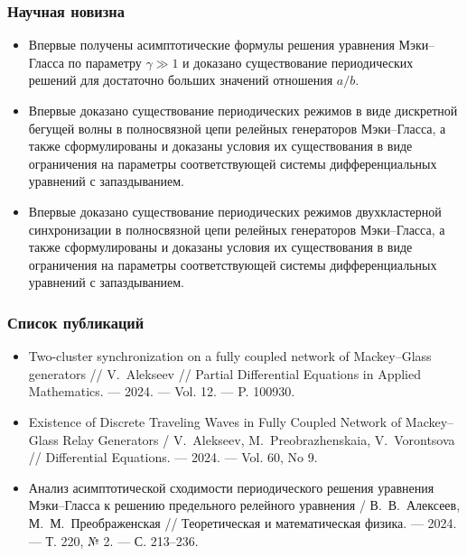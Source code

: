 \begin{frame}
    \frametitle{Научная новизна}
    \begin{itemize}
    	\item Впервые получены асимптотические формулы решения уравнения Мэки--Гласса по параметру $\gamma \gg 1$ и доказано существование периодических решений для достаточно больших значений отношения $a / b$.
    	\item Впервые доказано существование периодических режимов в виде дискретной бегущей волны в полносвязной цепи релейных генераторов Мэки--Гласса, а также сформулированы и доказаны условия их существования в виде ограничения на параметры соответствующей системы дифференциальных уравнений с запаздыванием.
    	\item Впервые доказано существование периодических режимов двухкластерной синхронизации в полносвязной цепи релейных генераторов Мэки--Гласса, а также сформулированы и доказаны условия их существования в виде ограничения на параметры соответствующей системы дифференциальных уравнений с запаздыванием.
    \end{itemize}
\end{frame}

\begin{frame} %
	\frametitle{Список публикаций}
	\begin{itemize}
		\item Two-cluster synchronization on a fully coupled network of Mackey--Glass generators // V.~Alekseev // Partial Differential Equations in Applied Mathematics. --- 2024. --- Vol. 12. --- P. 100930.
		\item Existence of Discrete Traveling Waves in Fully Coupled Network of Mackey--Glass Relay Generators / V.~Alekseev, M.~Preobrazhenskaia, V.~Vorontsova // Differential Equations. --- 2024. --- Vol. 60, No 9.
		\item Анализ асимптотической сходимости периодического решения уравнения Мэки--Гласса к решению предельного релейного уравнения / В.~В.~Алексеев, М.~М.~Преображенская // Теоретическая и математическая физика. --- 2024. --- Т. 220, № 2. --- С. 213--236.
    \end{itemize}
\end{frame}

